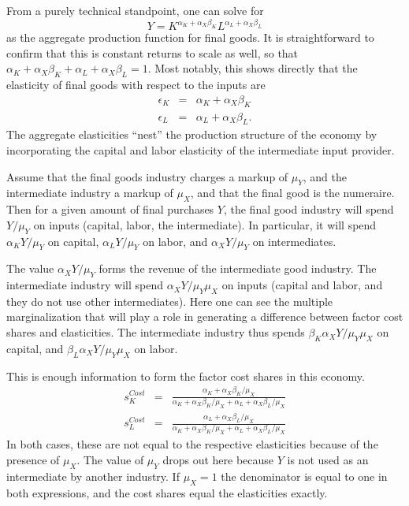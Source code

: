 \documentclass[11pt]{article}
\begin{document}
From a purely technical standpoint, one can solve for
\begin{equation}
	Y = K^{\alpha_K + \alpha_X \beta_K} L^{\alpha_L + \alpha_X \beta_L}
\end{equation}
as the aggregate production function for final goods. It is straightforward to confirm that this is constant returns to scale as well, so that $\alpha_K + \alpha_X \beta_K + \alpha_L + \alpha_X \beta_L = 1$. Most notably, this shows directly that the elasticity of final goods with respect to the inputs are
\begin{eqnarray}
	\epsilon_K &=& \alpha_K + \alpha_X \beta_K \\
	\epsilon_L &=& \alpha_L + \alpha_X \beta_L. 
\end{eqnarray}
The aggregate elasticities ``nest'' the production structure of the economy by incorporating the capital and labor elasticity of the intermediate input provider.

Assume that the final goods industry charges a markup of $\mu_Y$, and the intermediate industry a markup of $\mu_X$, and that the final good is the numeraire. Then for a given amount of final purchases $Y$, the final good industry will spend $Y/\mu_Y$ on inputs (capital, labor, the intermediate). In particular, it will spend $\alpha_K Y/\mu_Y$ on capital, $\alpha_L Y/\mu_Y$ on labor, and $\alpha_X Y/\mu_Y$ on intermediates. 

The value $\alpha_X Y/\mu_Y$ forms the revenue of the intermediate good industry. The intermediate industry will spend $\alpha_X Y/\mu_Y \mu_X$ on inputs (capital and labor, and they do not use other intermediates). Here one can see the multiple marginalization that will play a role in generating a difference between factor cost shares and elasticities. The intermediate industry thus spends $\beta_K \alpha_X Y/\mu_Y \mu_X$ on capital, and $\beta_L \alpha_X Y/\mu_Y \mu_X$ on labor. 

This is enough information to form the factor cost shares in this economy.
\begin{eqnarray}
	s_K^{Cost} &=& \frac{\alpha_K + \alpha_X \beta_K/\mu_X}{\alpha_K + \alpha_X \beta_K/\mu_X + \alpha_L + \alpha_X \beta_L/\mu_X} \\
	s_L^{Cost} &=& \frac{\alpha_L + \alpha_X \beta_L/\mu_X}{\alpha_K + \alpha_X \beta_K/\mu_X + \alpha_L + \alpha_X \beta_L/\mu_X}
\end{eqnarray}
In both cases, these are not equal to the respective elasticities because of the presence of $\mu_X$. The value of $\mu_Y$ drops out here because $Y$ is not used as an intermediate by another industry. If $\mu_X = 1$ the denominator is equal to one in both expressions, and the cost shares equal the elasticities exactly. 
\end{document}
